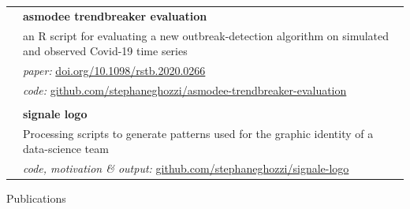 \documentclass[a4paper,11pt,oneside]{article}
\begin{document}
\noindent \begin{longtable}{@{}p{3.1cm}@{}@{}p{13.9cm}@{}} 
   & \textbf{asmodee trendbreaker evaluation} \\
   & an R script for evaluating a new outbreak-detection algorithm on simulated and observed Covid-19 time series \\
   & \emph{paper:} \href{https://doi.org/10.1098/rstb.2020.0266}{doi.org/10.1098/rstb.2020.0266}\\
   & \emph{code:} \href{https://github.com/stephaneghozzi/asmodee-trendbreaker-evaluation}{github.com/stephaneghozzi/asmodee-trendbreaker-evaluation} \\
   & \\
   & \textbf{signale logo} \\
   & Processing scripts to generate patterns used for the graphic identity of a data-science team \\
   & \emph{code, motivation \& output:} \href{https://github.com/stephaneghozzi/signale-logo}{github.com/stephaneghozzi/signale-logo} \\
\end{longtable}

\vspace{1em}

\noindent {\color{gray}\hrule} 
   
\vspace{2em}
   
\noindent \Large{Publications}

\vspace{0.5em}

\normalsize
\nocite{*}
\begingroup
\renewcommand{\section}[2]{}


\endgroup
\end{document}
